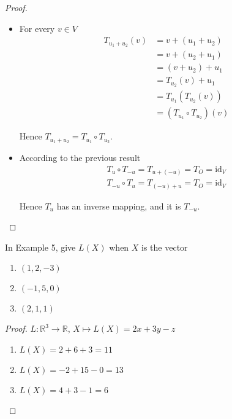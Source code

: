 \begin{proof}
    \begin{itemize}
        \item For every $v\in V$
              \begin{align*}
                  T_{u_{1} + u_{2}}(v) & = v + (u_{1} + u_{2})            \\
                                       & = v + (u_{2} + u_{1})            \\
                                       & = (v + u_{2}) + u_{1}            \\
                                       & = T_{u_{2}}(v) + u_{1}           \\
                                       & = T_{u_{1}}(T_{u_{2}}(v))        \\
                                       & = (T_{u_{1}} \circ T_{u_{2}})(v)
              \end{align*}

              Hence $T_{u_{1} + u_{2}} = T_{u_{1}} \circ T_{u_{2}}$.
        \item According to the previous result
              \[
                  \begin{split}
                      T_{u}\circ T_{-u} = T_{u + (-u)} = T_{O} = \text{id}_{V} \\
                      T_{-u}\circ T_{u} = T_{(-u) + u} = T_{O} = \text{id}_{V}
                  \end{split}
              \]

              Hence $T_{u}$ has an inverse mapping, and it is $T_{-u}$.
    \end{itemize}
\end{proof}

\begin{exercise}
    In Example 5, give $L(X)$ when $X$ is the vector
    \begin{enumerate}[label={(\alph*)}]
        \item $(1, 2, -3)$
        \item $(-1, 5, 0)$
        \item $(2, 1, 1)$
    \end{enumerate}
\end{exercise}

\begin{proof}
    $L: \mathbb{R}^{3} \to \mathbb{R}$, $X\mapsto L(X) = 2x + 3y - z$

    \begin{enumerate}[label={(\alph*)}]
        \item $L(X) = 2 + 6 + 3 = 11$
        \item $L(X) = -2 + 15 - 0 = 13$
        \item $L(X) = 4 + 3 - 1 = 6$
    \end{enumerate}
\end{proof}


